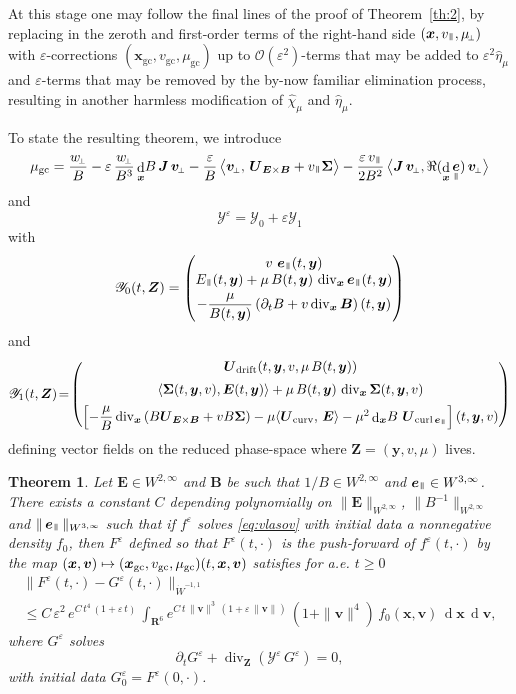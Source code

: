 \documentclass[10pt]{amsart}
\let\mathcal\mathscr
\newcommand\mto{\mathchoice{\longmapsto}{\mapsto}{\mapsto}{\mapsto}}
\newcommand{\sperp}{{\scriptscriptstyle\perp}}
\newcommand{\blangle}{\bigl\langle}
\newcommand{\brangle}{\bigr\rangle}
\let\eps\varepsilon
\let\d\partial
\DeclareMathOperator\dD{d}\let\dd\dD
\DeclareMathOperator{\Div}{div}
\DeclareMathOperator{\Curl}{curl}
\theoremstyle{plain}
\newtheorem{theorem}{Theorem}[section]
\theoremstyle{definition}
\newcommand\bp{\begin{pmatrix}}
\newcommand\ep{\end{pmatrix}}
\newcommand{\be}{\begin{equation}}
\newcommand{\ee}{\end{equation}}
\newcommand{\bt}{\begin{theorem}}
\newcommand{\et}{\end{theorem}}
\newcommand\R{\mathbf R}
\newcommand\bB{{\boldsymbol B}}
\newcommand\bE{{\boldsymbol E}}
\newcommand\bJ{{\boldsymbol J}}
\newcommand\bU{{\boldsymbol U}}
\newcommand\bfv{{\boldsymbol v}}
\newcommand\bfx{{\boldsymbol x}}
\newcommand\bfy{{\boldsymbol y}}
\newcommand\bfZ{{\boldsymbol Z}}
\newcommand\Sig{{\boldsymbol \Sigma}}
\newcommand\cO{{\mathcal O}}
\newcommand\cY{{\mathcal Y}}
\DeclareMathOperator{\beD}{\boldsymbol{e}}
\newcommand\eDpar{\beD_\mypar}
\newcommand\vpar{v_\mypar}
\newcommand\bvperp{\bfv_{\!\sperp}}
\newcommand\eperp{w_{\!\sperp}}
\newcommand\muperp{\mu_{\!\sperp}}
\newcommand\Epar{E_\mypar}
\newcommand{\GC}{\bfx_\mathrm{gc}}
\newcommand{\vGC}{v_\mathrm{gc}}
\newcommand{\muGC}{\mu_\mathrm{gc}}
\newcommand{\EcB}{\bU_{\bE\times\bB}}
\newcommand{\curvB}{\bU_{\mathrm{curv}}}
\newcommand{\rotB}{\bU_{\Curl\eDpar}}
\newcommand{\Ud}{\bU_{\mathrm{drift}}}
\newcommand{\mypar}{{\mkern3mu\vphantom{\perp}\vrule depth 0pt\mkern2mu\vrule depth 0pt\mkern3mu}}
\begin{document}
At this stage one may follow the final lines of the proof of Theorem~\ref{th:2}, by replacing in the zeroth and first-order terms of the right-hand side $(\bfx,\vpar,\muperp)$ with $\eps$-corrections $(\GC,\vGC,\muGC)$ up to $\cO(\eps^2)$-terms that may be added to $\eps^2\widehat\eta_\mu$ and $\eps$-terms that may be removed by the by-now familiar elimination process, resulting in another harmless modification of $\widehat\chi_\mu$ and $\widehat\eta_\mu$.

To state the resulting theorem, we introduce
\be\label{muGC}
\muGC=
\frac{\eperp}{B}
-\eps\,\frac{\eperp}{B^3}\dD_\bfx\!B\, \bJ\,\bvperp
-\frac{\eps}{B} \,\blangle\bvperp,
\,\EcB+\vpar\Sig\brangle
-\frac{\eps\,\vpar}{2B^2}
\,\blangle\bJ\,\bvperp,\Re(\dD_\bfx\eDpar)\,\bvperp\brangle
\ee
and
\[
\cY^\eps=\cY_0+\eps\cY_1
\]
with
\[
\cY_0(t,\bfZ)
=\bp
v\,\eDpar(t,\bfy)\\
\Epar(t,\bfy)+\mu\,B(t,\bfy)\,\Div_\bfx\eDpar(t,\bfy)\\[3pt]
-\dfrac{\mu}{B(t,\bfy)}\left(\d_tB+v\Div_\bfx\bB\right)(t,\bfy)
\ep
\]
and
\[
\cY_1(t,\bfZ)
\!=\! \bp
\Ud(t,\bfy,v,\mu\,B(t,\bfy))
\\[5pt]
\langle\Sig(t,\bfy,v),\bE(t,\bfy)\rangle
+\mu\,B(t,\bfy)\,\Div_\bfx\Sig(t,\bfy,v)
\\[5pt]
\left[-\dfrac{\mu}{B}\Div_\bfx\left(B \EcB+v B\Sig\right)
-\mu\langle\curvB,\,\bE\rangle
-\mu^2\dD_\bfx\!B\ \rotB\right](t,\bfy,v)
\ep
\]
defining vector fields on the reduced phase-space where $\bfZ=(\bfy,v,\mu)$ lives.

\bt
\label{th:2-mu}
Let $\bE\in W^{2,\infty}$ and $\bB$ be such that $1/B\in W^{2,\infty}$ and $\eDpar\in W^{3,\infty}$. There exists a constant $C$ depending polynomially on $\|\bE\|_{W^{2,\infty}}$, $\|B^{-1}\|_{W^{2,\infty}}$ and $\|\eDpar\|_{W^{3,\infty}}$ such that if $f^\eps$ solves \eqref{eq:vlasov} with initial data a nonnegative density $f_0$, then $F^\eps$ defined so that $F^\eps(t,\cdot)$ is the push-forward of $f^\eps(t,\cdot)$ by the map $(\bfx,\bfv)\mto (\GC,\vGC,\muGC)(t,\bfx,\bfv)$ satisfies for a.e. $t\geq0$
\begin{multline*}
\|F^\eps(t,\cdot)-G^\eps(t,\cdot)\|_{\dot{W}^{-1,1}}\\
\leq
C\,\eps^2\,e^{C\,t^4\,(1+\eps\,t)}\,\int_{\R^6} e^{C\,t\,\|\bfv\|^3\,(1+\eps\,\|\bfv\|)}\,(1+\|\bfv\|^4)\,f_0(\bfx,\bfv)\,\dD\bfx\,\dD\bfv,
\end{multline*}
where $G^\eps$ solves
\be
\label{eq:2nd-mu}
\d_t G^\eps+\Div_{\bfZ} \left(\cY^\eps\,G^\eps\right)
=0,
\ee
with initial data $G_{0}^\eps=F^\eps(0,\cdot)$.
\et
\end{document}
